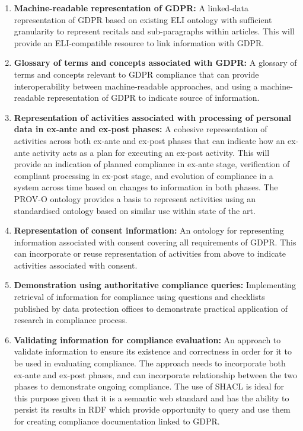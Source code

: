 \begin{enumerate}
\item \textbf{Machine-readable representation of GDPR:} A linked-data representation of GDPR based on existing ELI ontology with sufficient granularity to represent recitals and sub-paragraphs within articles. This will provide an ELI-compatible resource to link information with GDPR.
\item \textbf{Glossary of terms and concepts associated with GDPR:} A glossary of terms and concepts relevant to GDPR compliance that can provide interoperability between machine-readable approaches, and using a machine-readable representation of GDPR to indicate source of information.
\item \textbf{Representation of activities associated with processing of personal data in ex-ante and ex-post phases:} A cohesive representation of activities across both ex-ante and ex-post phases that can indicate how an ex-ante activity acts as a plan for executing an ex-post activity. This will provide an indication of planned compliance in ex-ante stage, verification of compliant processing in ex-post stage, and evolution of compliance in a system across time based on changes to information in both phases. The PROV-O ontology provides a basis to represent activities using an standardised ontology based on similar use within state of the art.
\item \textbf{Representation of consent information:} An ontology for representing information associated with consent covering all requirements of GDPR. This can incorporate or reuse representation of activities from above to indicate activities associated with consent.
\item \textbf{Demonstration using authoritative compliance queries:} Implementing retrieval of information for compliance using questions and checklists published by data protection offices to demonstrate practical application of research in compliance process.
\item \textbf{Validating information for compliance evaluation:} An approach to validate information to ensure its existence and correctness in order for it to be used in evaluating compliance. The approach needs to incorporate both ex-ante and ex-post phases, and can incorporate relationship between the two phases to demonstrate ongoing compliance. The use of SHACL is ideal for this purpose given that it is a semantic web standard and has the ability to persist its results in RDF which provide opportunity to query and use them for creating compliance documentation linked to GDPR.
\end{enumerate}
